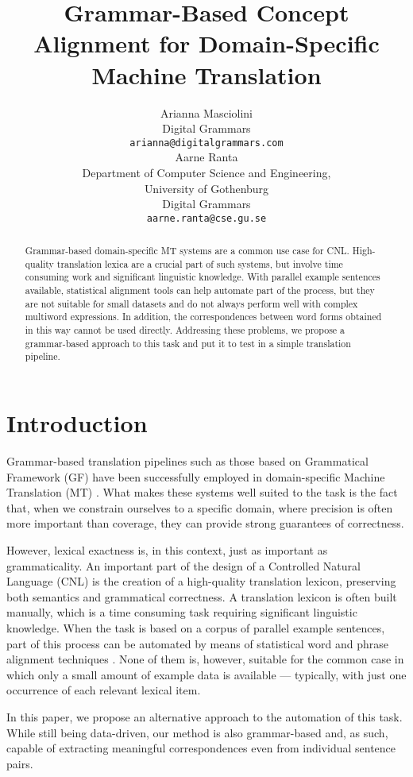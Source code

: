 \documentclass[11pt]{article}
\title{Grammar-Based Concept Alignment for Domain-Specific Machine Translation}
\author{Arianna Masciolini \\
  Digital Grammars \\
  \texttt{arianna@digitalgrammars.com} \\\And
  Aarne Ranta \\
  Department of Computer Science and Engineering, \\
  University of Gothenburg \\
  Digital Grammars \\
  \texttt{aarne.ranta@cse.gu.se} \\}
\begin{document}
\maketitle
\begin{abstract}
Grammar-based domain-specific MT systems are a common use case for CNL.
High-quality translation lexica are a crucial part of such systems, but involve time consuming work and significant linguistic knowledge. 
With parallel example sentences available, statistical alignment tools
can help automate part of the process, but they are not suitable for
small datasets and do not always perform well with complex multiword expressions. 
In addition, the correspondences between word forms obtained in this way cannot be used directly.
Addressing these problems, we propose a grammar-based approach to this task and put it to test in a simple translation pipeline.
\end{abstract}

\section{Introduction}
Grammar-based translation pipelines such as those based on Grammatical Framework (GF) have been successfully employed in domain-specific Machine Translation (MT) \cite{ranta-etal-2020-abstract}.  
What makes these systems well suited to the task is the fact that, when we constrain ourselves to a specific domain, where precision is often more important than coverage, they can provide strong guarantees of correctness. 

However, lexical exactness is, in this context, just as important as grammaticality. 
An important part of the design of a Controlled Natural Language (CNL) is the creation of a high-quality translation lexicon, preserving both semantics and grammatical correctness.
A translation lexicon is often built manually, which is a time consuming task requiring significant linguistic knowledge. 
When the task is based on a corpus of parallel example sentences, part of this process can be automated by means of statistical word and phrase alignment techniques \cite{brown-etal-1993-mathematics, och-ney-2000-improved, dyer-etal-2013-simple}. 
None of them is, however, suitable for the common case in which only a small amount of example data is available --- typically, with just one occurrence of each relevant lexical item.

In this paper, we propose an alternative approach to the automation of this task. 
While still being data-driven, our method is also grammar-based and, as such, capable of extracting meaningful correspondences even from individual sentence pairs. 
\end{document}
